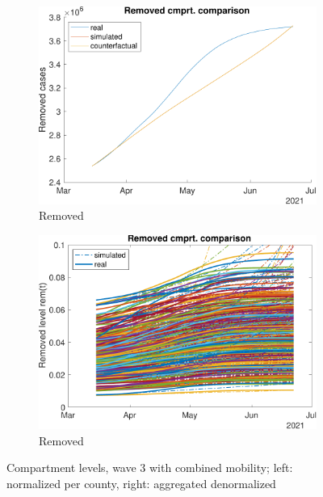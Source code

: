 \begin{figure}[hbtp]
     \newline
     \begin{subfigure}[b]{.45\linewidth}
         \centering
         \includegraphics[width=\linewidth]{img/210907_224100_combined_wave3/figures/COMP_rem}
         \caption{Removed}
         \label{fig:compAggrCombWave3Rem}
     \end{subfigure}
     \hfill
     \begin{subfigure}[b]{.45\linewidth}
         \centering
         \includegraphics[width=\linewidth]{img/210907_224100_combined_wave3/figures/SEIR_r_sim-vs-real}
         \caption{Removed}
         \label{fig:compCombWave3Rem}
     \end{subfigure}     
     \caption{Compartment levels, wave 3 with combined mobility; left: normalized per county, right: aggregated denormalized}
     \label{fig:compCombWave3}
\end{figure}


